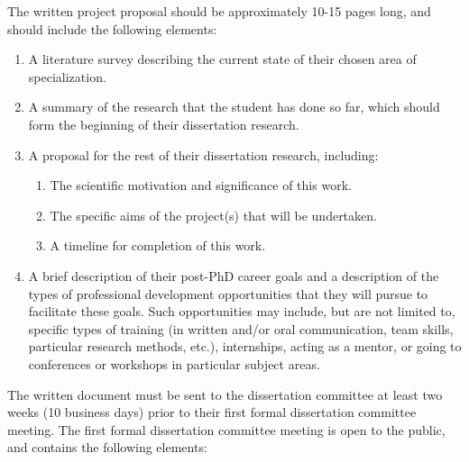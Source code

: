 The written project proposal should be approximately 10-15 pages long, and should include the following elements:

\begin{enumerate}
\item  A literature survey describing the current state of their chosen area of specialization.
\item  A summary of the research that the student has done so far, which should form the beginning of their dissertation research.
\item  A proposal for the rest of their dissertation research, including:

\begin{enumerate}
  \item  The scientific motivation and significance of this work.
  \item  The specific aims of the project(s) that will be undertaken.
  \item  A timeline for completion of this work.
\end{enumerate}

\item  A brief description of their post-PhD career goals and a
  description of the types of professional development opportunities
  that they will pursue to facilitate these goals.  Such opportunities
  may include, but are not limited to, specific types of training (in
  written and/or oral communication, team skills, particular research
  methods, etc.), internships, acting as a mentor, or going to
  conferences or workshops in particular subject areas.

\end{enumerate}

The written document must be sent to the dissertation committee at least two
weeks (10 business days) prior to their first formal dissertation committee
meeting.  The first formal dissertation committee meeting is open to the public,
and contains the following elements:


